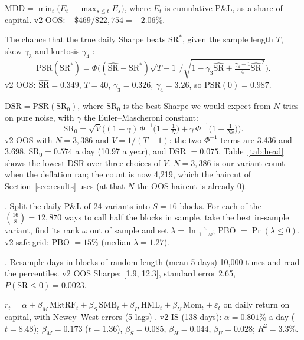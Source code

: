 \documentclass[11pt,letterpaper]{article}
\begin{document}
 \(\text{MDD} = \min_t \big(E_t - \max_{s\le t} E_s\big)\), where \(E_t\) is cumulative
P\&L, as a share of capital. v2 OOS: \(−\$469 / \$22,754 = −2.06\%\).

 The chance that the true daily Sharpe beats \(\text{SR}^*\), given the sample length
\(T\), skew \(\gamma_3\) and kurtosis \(\gamma_4\) \citep{bailey2014}:
\[\text{PSR}(\text{SR}^*) = \Phi\Big((\widehat{\text{SR}}-\text{SR}^*)\sqrt{T-1}\,\Big/\sqrt{1-\gamma_3\widehat{\text{SR}}+\tfrac{\gamma_4-1}{4}\widehat{\text{SR}}^2}\Big).\]
v2 OOS: \(\widehat{\text{SR}} = 0.349\), \(T = 40\),
\(\gamma_3 = 0.326\), \(\gamma_4 = 3.26\), so \(\text{PSR}(0) = 0.987\).

 \(\text{DSR} = \text{PSR}(\text{SR}_0)\), where \(\text{SR}_0\) is the best Sharpe we would
expect from \(N\) tries on pure noise, with \(\gamma\) the Euler--Mascheroni constant:
\[\text{SR}_0 = \sqrt{V}\Big((1-\gamma)\,\Phi^{-1}\big(1-\tfrac1N\big) + \gamma\,\Phi^{-1}\big(1-\tfrac{1}{Ne}\big)\Big).\] v2 OOS with \(N =
3,386\) and \(V = 1/(T-1)\): the two \(\Phi^{-1}\) terms are 3.436 and 3.698,
\(\text{SR}_0 = 0.574\) a day (10.97 a year), and DSR \(= 0.075\).
Table~\ref{tab:head} shows the lowest DSR over three choices of \(V\). \(N = 3,386\) is our variant
count when the deflation ran; the count is now 4,219, which the haircut of Section~\ref{sec:results}
uses (at that \(N\) the OOS haircut is already 0).

 \citep{bailey2017}. Split the daily P\&L of 24
variants into \(S = 16\) blocks. For each of the \(\binom{16}{8} = 12,870\) ways
to call half the blocks in sample, take the best in-sample variant, find its rank \(\omega\) out of sample and set
\(\lambda = \ln\frac{\omega}{1-\omega}\); PBO \(= \Pr(\lambda \le 0)\). v2-safe grid: PBO \(= 15\%\)
(median \(\lambda = 1.27\)).

 \citep{politis1994}. Resample days in blocks of random length (mean 5 days)
10,000 times and read the percentiles. v2 OOS Sharpe: [1.9, 12.3], standard error 2.65,
\(P(\text{SR}\le 0) = 0.0023\).

 \(r_t = \alpha + \beta_M\,\text{MktRF}_t + \beta_S\,\text{SMB}_t + \beta_H\,\text{HML}_t
+ \beta_U\,\text{Mom}_t + \varepsilon_t\) on daily return on capital, with Newey--West errors (5 lags)
\citep{fama1993,carhart1997,newey1987,french}. v2 IS (138 days): \(\alpha = 0.801\%\) a day
(\(t = 8.48\)); \(\beta_M = 0.173\) (\(t = 1.36\)),
\(\beta_S = 0.085\), \(\beta_H = 0.044\), \(\beta_U = 0.028\);
\(R^2 = 3.3\%\).
\end{document}
